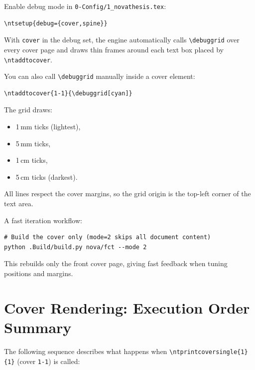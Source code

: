 Enable debug mode in \verb!0-Config/1_novathesis.tex!:

\begin{verbatim}
\ntsetup{debug={cover,spine}}
\end{verbatim}

With \texttt{cover} in the debug set, the engine automatically calls
\verb!\debuggrid! over every cover page and draws thin frames around each
text box placed by \verb!\ntaddtocover!.

You can also call \verb!\debuggrid! manually inside a cover element:
\begin{verbatim}
\ntaddtocover{1-1}{\debuggrid[cyan]}
\end{verbatim}

The grid draws:
\begin{itemize}
  \item 1\,mm ticks (lightest),
  \item 5\,mm ticks,
  \item 1\,cm ticks,
  \item 5\,cm ticks (darkest).
\end{itemize}

All lines respect the cover margins, so the grid origin is the top-left
corner of the text area.

\medskip
A fast iteration workflow:
\begin{verbatim}
# Build the cover only (mode=2 skips all document content)
python .Build/build.py nova/fct --mode 2
\end{verbatim}

This rebuilds only the front cover page, giving fast feedback when tuning
positions and margins.


\section{Cover Rendering: Execution Order Summary}
\label{sec:covers_order}

The following sequence describes what happens when
\verb!\ntprintcoversingle{1}{1}! (cover \texttt{1-1}) is called:

